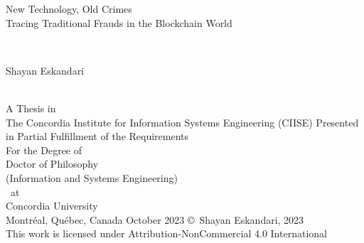 
\thispagestyle{empty} %

\begin{center} 
\begin{Large} New Technology, Old Crimes \\ Tracing Traditional Frauds in the Blockchain World\end{Large}\\[3em]
\begin{large} Shayan Eskandari \end{large}\\
\vfill
A Thesis in\\
The Concordia Institute for Information Systems Engineering (CIISE)
\vfill
Presented in Partial Fulfillment of the Requirements\\
For the Degree of\\
Doctor of Philosophy\\ 
(Information and Systems Engineering)\\~at\\
Concordia University\\
Montr\'{e}al, Qu\'{e}bec, Canada
\vfill
October 2023 %
\vfill
\copyright~Shayan Eskandari, 2023\\
This work is licensed under Attribution-NonCommercial 4.0 International
\end{center}

